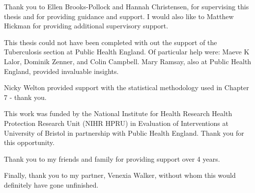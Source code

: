 \documentclass[11pt,twoside]{bristolthesis}
\begin{document}
      \begin{acknowledgements}
      Thank you to Ellen Brooks-Pollock and Hannah Christensen, for supervising this thesis and for providing guidance and support. I would also like to Matthew Hickman for providing additional supervisory support.
      
      \par
      
      This thesis could not have been completed with out the support of the Tuberculosis section at Public Health England. Of particular help were: Maeve K Lalor, Dominik Zenner, and Colin Campbell. Mary Ramsay, also at Public Health England, provided invaluable insights.
      
      \par
      
      Nicky Welton provided support with the statistical methodology used in Chapter 7 - thank you.
      
      \par
      
      This work was funded by the National Institute for Health Research Health Protection Research Unit (NIHR HPRU) in Evaluation of Interventions at University of Bristol in partnership with Public Health England. Thank you for this opportunity.
      
      \par
      
      Thank you to my friends and family for providing support over 4 years.
      
      \par
      
      Finally, thank you to my partner, Venexia Walker, without whom this would definitely have gone unfinished.
    \end{acknowledgements}
\end{document}
